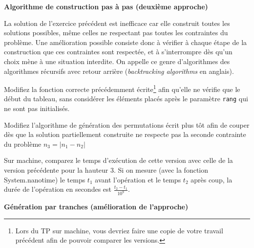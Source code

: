 \documentclass[10pt]{article}\usepackage[correction,nu]{esial}
\begin{document}
\begin{Exercice}\textbf{Algorithme de construction pas à pas (deuxième approche)}

  \noindent La solution de l'exercice précédent est inefficace car elle
  construit toutes les solutions possibles, même celles ne respectant pas toutes
  les contraintes du problème. Une amélioration possible consiste donc à
  vérifier à chaque étape de la construction que ces contraintes sont respectée,
  et à s'interrompre dès qu'un choix mène à une situation interdite.
  On appelle ce genre d'algorithmes des algorithmes récursifs avec retour
  arrière (\textit{backtracking algorithms} en anglais).

  \begin{Question}
    Modifiez la fonction correcte précédemment écrite\footnote{Lors du TP sur
      machine, vous devriez faire une copie de votre travail précédent afin de
      pouvoir comparer les versions.} afin qu'elle ne vérifie
    que le début du tableau, sans considérer les éléments placés après le
    paramètre \texttt{rang} qui ne sont pas initialisés.
  \end{Question}

  \begin{Reponse}
    \newcommand*\FancyVerbStartString{// BEGIN CORRECTE}
    \newcommand*\FancyVerbStopString{// END CORRECTE}
  \end{Reponse}

  \Question %
  Modifiez l'algorithme de génération des permutations écrit plus tôt afin de
  couper dès que la solution partiellement construite ne respecte pas la seconde
  contrainte du problème $n_3=\left|n_1-n_2\right|$

  \begin{Reponse}
    \newcommand*\FancyVerbStartString{// BEGIN GENERE}
    \newcommand*\FancyVerbStopString{// END GENERE}
  \end{Reponse}

  \Question %
  Sur machine, comparez le temps d'exécution de cette version avec celle de la
  version précédente pour la hauteur 3.  Si on mesure (avec la fonction
  System.nanotime) le temps $t_1$ avant l'opération et le temps $t_2$ après
  coup, la durée de l'opération en secondes est $\frac{t_2-t_1}{10^9}$.
\end{Exercice}

\begin{Exercice}\textbf{Génération par tranches (amélioration de l'approche)}
\end{Exercice}
\end{document}
